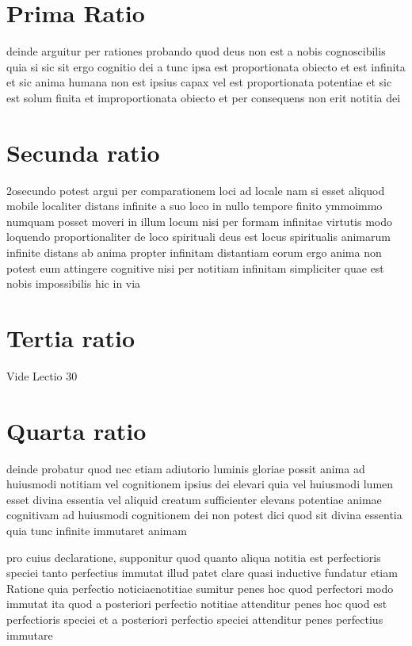 \documentclass[twoside, openright]{report}
\begin{document}
        \bigskip
         \section*{Prima Ratio} 
        \pstart
        deinde arguitur per rationes probando quod deus non est a nobis cognoscibilis quia si sic sit ergo cognitio dei a tunc ipsa est proportionata obiecto et est infinita et sic anima humana non est ipsius capax vel est proportionata potentiae et sic est solum finita et improportionata obiecto et per consequens non erit notitia dei
        \pend
      
        \bigskip
         \section*{Secunda ratio} 
        \pstart
        2osecundo potest argui per comparationem loci ad locale nam si esset aliquod mobile localiter distans infinite a suo loco in nullo tempore finito ymmoimmo numquam posset moveri in illum locum nisi per formam infinitae virtutis modo loquendo proportionaliter de loco spirituali deus est locus spiritualis animarum infinite distans ab anima propter infinitam distantiam eorum ergo anima non potest eum attingere cognitive nisi per notitiam infinitam simpliciter quae est nobis impossibilis hic in via
        \pend
       
        \bigskip
         \section*{Tertia ratio} 
        \pstart
        Vide Lectio 30
        \pend
       
        \bigskip
         \section*{Quarta ratio} 
        \pstart
        deinde probatur quod nec etiam adiutorio luminis gloriae possit anima ad huiusmodi notitiam vel cognitionem ipsius dei elevari quia vel huiusmodi lumen esset divina essentia vel aliquid creatum sufficienter elevans potentiae animae cognitivam ad huiusmodi cognitionem dei non potest dici quod sit divina essentia quia tunc infinite immutaret animam
        \pend
     
        \pstart
        pro cuius declaratione, supponitur quod quanto aliqua notitia est perfectioris speciei tanto perfectius immutat illud patet clare quasi inductive fundatur etiam Ratione quia perfectio noticiaenotitiae sumitur penes hoc quod perfectori modo immutat ita quod a posteriori perfectio notitiae attenditur penes hoc quod est perfectioris speciei et a posteriori perfectio speciei attenditur penes perfectius immutare
        \pend
     
\end{document}
